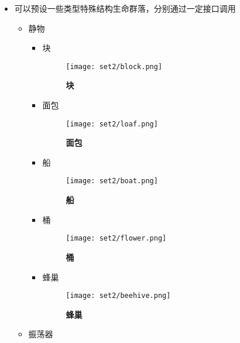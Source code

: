 \documentclass[11pt]{article}
\providecommand{\tightlist}{%
      \setlength{\itemsep}{0pt}\setlength{\parskip}{0pt}}
\begin{document}
\begin{itemize}
\tightlist
\item
  可以预设一些类型特殊结构生命群落，分别通过一定接口调用

  \begin{itemize}
  \item
    静物
    
    \begin{itemize}
    \item
      块 
    \begin{figure}
        \centering
        \texttt{[image: set2/block.png]}
        \caption{\textbf{块}}
    \end{figure}
    \item
      面包
    \begin{figure}
        \centering
        \texttt{[image: set2/loaf.png]}
        \caption{\textbf{面包}}
    \end{figure}
    \item
      船
    \begin{figure}
        \centering
        \texttt{[image: set2/boat.png]}
        \caption{\textbf{船}}
    \end{figure}
    \item
      桶
    \begin{figure}
        \centering
        \texttt{[image: set2/flower.png]}
        \caption{\textbf{桶}}
    \end{figure}   
    \item 
      蜂巢
    \begin{figure}
        \centering
        \texttt{[image: set2/beehive.png]}
        \caption{\textbf{蜂巢}}
    \end{figure}
    \end{itemize}

  \item
    振荡器


\end{itemize}
\end{itemize}
\end{document}
